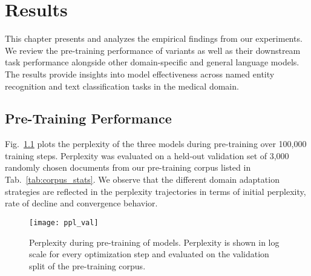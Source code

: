 \chapter{Results} \label{chap:results}

This chapter presents and analyzes the empirical findings from our experiments.
We review the pre-training performance of \ChristBERT{} variants as well as
their downstream task performance alongside other domain-specific and general
language models. The results provide insights into model effectiveness across
named entity recognition and text classification tasks in the medical domain.

\section{Pre-Training Performance}

Fig.~\ref{fig:ppl} plots the perplexity of the three \ChristBERT{} models during
pre-training over 100,000 training steps. Perplexity was evaluated on a held-out
validation set of 3,000 randomly chosen documents from our pre-training corpus
listed in Tab.~\ref{tab:corpus_stats}. We observe that the different domain
adaptation strategies are reflected in the perplexity trajectories in terms of
initial perplexity, rate of decline and convergence behavior. 

\begin{figure}[htbp]
  \centering
  \texttt{[image: ppl\_val]}
  \caption[Perplexity during pre-training of \ChristBERT{} models]{Perplexity
  during pre-training of \ChristBERT{} models. Perplexity is shown in log scale
  for every optimization step and evaluated on the validation split
  of the pre-training corpus.}
  \label{fig:ppl}
\end{figure}

